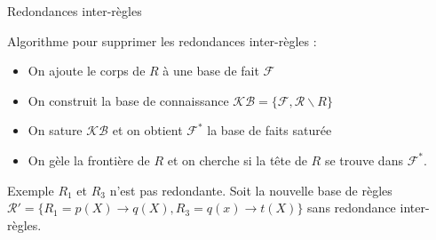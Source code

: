 \begin{frame}{Redondances inter-règles}
   
  Algorithme pour supprimer les redondances inter-règles :
    
    \begin{itemize}
        \item On ajoute le corps de $R$ à une base de fait $\mathcal{F}$
        \item On construit la base de connaissance $\mathcal{KB} = \{\mathcal{F}, \mathcal{R} \backslash R \}$
     
        \item On sature $\mathcal{KB}$ et on obtient $\mathcal{F}^*$ la base de faits saturée
        \item On gèle la frontière de $R$ et on cherche si la tête de $R$ se trouve dans $\mathcal{F}^*$.
   
    \end{itemize}
    
    \begin{block}{Exemple}
    $R_1$ et $R_3$ n'est pas redondante. 
        Soit la nouvelle base de règles $\mathcal{R}' = \{ R_1 = p(X) \xrightarrow{} q(X), R_3 = q(x) \xrightarrow{} t(X)\}$ sans redondance inter-règles.
    \end{block}
    
\end{frame}


